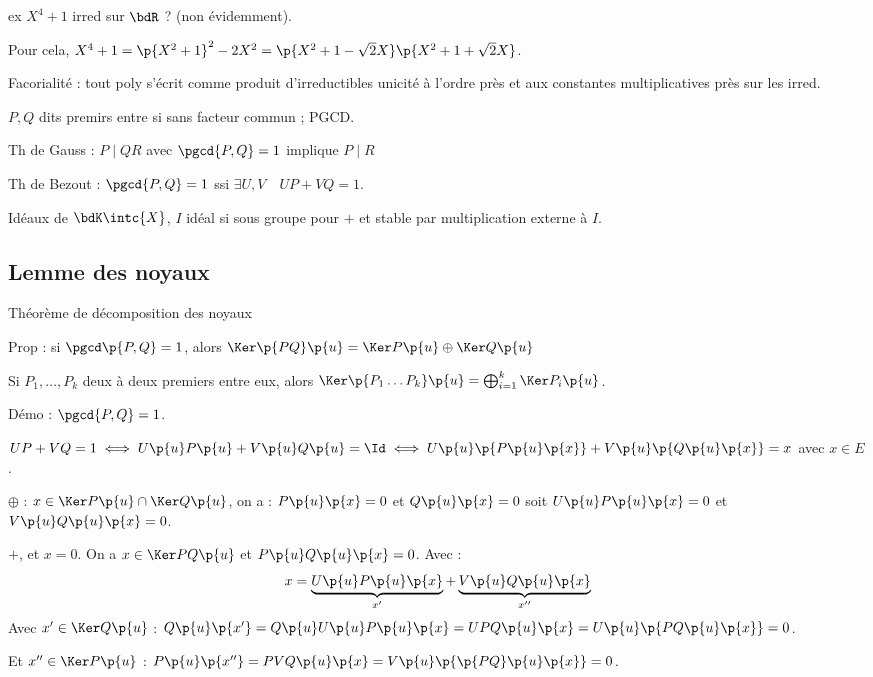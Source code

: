 \documentclass[a4paper,french,bookmarks]{book}
\begin{document}
    ex $X^4 + 1$ irred sur $\bdR$ ? (non évidemment).
    
    Pour cela, $X^4 + 1 = \p{X^2 + 1}^2 - 2X^2 = \p{X^2 + 1 - \sqrt{2}X}\p{X^2 + 1 + \sqrt{2}X}$.
    
    Facorialité : tout poly s'écrit comme produit d'irreductibles unicité à l'ordre près et aux constantes multiplicatives près sur les irred.
    
    $P, Q$ dits premirs entre si sans facteur commun ; PGCD.
    
    Th de Gauss : $P \mid QR$ avec $\pgcd{P, Q} = 1$ implique $P \mid R$ 
    
    Th de Bezout : $\pgcd{P, Q} = 1$ ssi $\exists U, V \quad UP + VQ = 1$.
    
    Idéaux de $\bdK\intc{X}$, $I$ idéal si sous groupe pour $+$ et stable par multiplication externe à $I$.
    
    \subsection{Lemme des noyaux}
    
    Théorème de décomposition des noyaux
    
    Prop : si $\pgcd\p{P, Q} = 1$, alors $\Ker\p{PQ}\p{u} = \Ker P\p{u} \oplus \Ker Q\p{u}$
    
    Si $P_1, \dots, P_k$ deux à deux premiers entre eux, alors $\Ker\p{P_1 \dots P_k}\p{u} = \bigoplus_{i=1}^k \Ker P_i\p{u}$.
    
    Démo : $\pgcd{P, Q} = 1$.
    
    $UP + VQ = 1 \iff U\p{u}P\p{u} + V\p{u}Q\p{u} = \Id \iff U\p{u}\p{P\p{u}\p{x}} + V\p{u}\p{Q\p{u}\p{x}} = x$ avec $x \in E$.
    
    \begin{enumerate}
        \itt $\oplus$ : $x \in \Ker P\p{u} \cap \Ker Q\p{u}$, on a :
        $P\p{u}\p{x} = 0$ et $Q\p{u}\p{x} = 0$ soit $U\p{u}P\p{u}\p{x} = 0$ et $V\p{u}Q\p{u}\p{x} = 0$.
        
        \itt $+$, et $x = 0$.
        On a $x \in \Ker PQ\p{u}$ et $P\p{u}Q\p{u}\p{x} = 0$. Avec :
        \[ x = \underbrace{U\p{u}P\p{u}\p{x}}_{x'} + \underbrace{V\p{u}Q\p{u}\p{x}}_{x''}\]
        Avec $x' \in \Ker Q\p{u}$ : $Q\p{u}\p{x'} = Q\p{u}U\p{u}P\p{u}\p{x} = UPQ\p{u}\p{x} = U\p{u}\p{PQ\p{u}\p{x}} = 0$.
        
        Et $x'' \in \Ker P\p{u}$ : $P\p{u}\p{x''} = PVQ\p{u}\p{x} = V\p{u}\p{\p{PQ}\p{u}\p{x}} = 0$.
        
        
    \end{enumerate}
\end{document}
